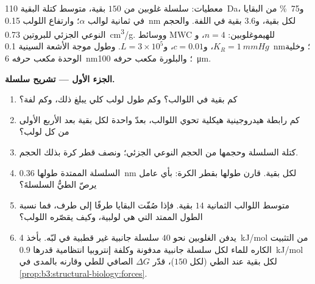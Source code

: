 \begin{problem}
\label{pb:b3:structural-biology:1}
معطيات: سلسلة غلوبين من $150$ بقية، متوسط كتلة البقية \qty{110}{Da}،
و\qty{75}{\%} من البقايا في ثمانية لوالب $\alpha$؛ وارتفاع اللولب
\qty{0.15}{nm} لكل بقية، و$3.6$ بقية في اللفة. والحجم النوعي
الجزئي للبروتين \qty{0.73}{cm^3/g}. ووسائط MWC للهيموغلوبين:
$n = 4$، و$K_{R} = \qty{1}{mmHg}$، و$c = 0.01$، و$L = 3\times 10^{5}$.
وطول موجة الأشعة السينية \qty{0.1}{nm}؛ وخلية الوحدة مكعب حرفه \qty{6}{nm}؛
والبلورة مكعب حرفه \qty{100}{\micro m}.

\medskip
\noindent\textbf{الجزء الأول --- تشريح سلسلة.}
\begin{enumerate}
  \item كم بقية في اللوالب؟ وكم طول لولب كلي
        يبلغ ذلك، وكم لفة؟
  \item كم رابطة هيدروجينية هيكلية تحوي اللوالب،
        بعدّ واحدة لكل بقية بعد الأربع الأولى من كل لولب؟
  \item كتلة السلسلة وحجمها من الحجم النوعي
        الجزئي؛ ونصف قطر كرة بذلك الحجم.
  \item السلسلة الممتدة طولها \qty{0.36}{nm} لكل بقية.
        قارن طولها بقطر الكرة: بأي عامل
        يرصّ الطيُّ السلسلةَ؟
  \item متوسط اللوالب الثمانية $14$ بقية. فإذا صُفّت البقايا
        طرفًا إلى طرف، فما نسبة الطول الممتد
        التي هي لولبية، وكيف يقصّره اللولب؟
  \item يدفن الغلوبين نحو $40$ سلسلة جانبية غير قطبية في لبّه.
        بأخذ \qty{4}{kJ/mol} من التثبيت الكاره للماء لكل سلسلة
        جانبية مدفونة وكلفة إنتروبيا انتظامية قدرها
        \qty{0.9}{kJ/mol} لكل بقية عند الطي (لكل $150$)، قدّر
        $\Delta G$ الصافي للطي وقارنه بالمدى في
        \cref{prop:b3:structural-biology:forces}.
\end{enumerate}


\end{problem}

